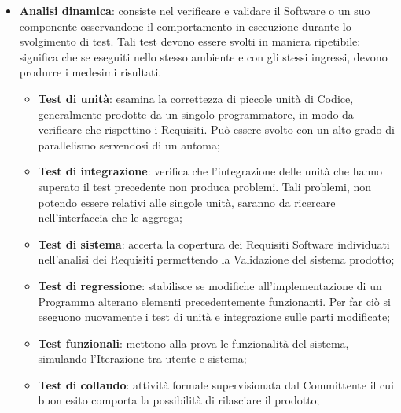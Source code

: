 {\begin{itemize}
\begin{itemize}
		\end{itemize}
		
		\item \textbf{Analisi dinamica}: consiste nel verificare e validare il Software o un suo componente osservandone il comportamento in esecuzione durante lo svolgimento di test. Tali test devono essere svolti in maniera ripetibile: significa che se eseguiti nello stesso ambiente e con gli stessi ingressi, devono produrre i medesimi risultati.
		\begin{itemize}
			\item \textbf{Test di unità}: esamina la correttezza di piccole unità di Codice, generalmente prodotte da un singolo programmatore, in modo da verificare che  rispettino i Requisiti. Può essere svolto con un alto grado di parallelismo servendosi di un automa;		
			\item \textbf{Test di integrazione}: verifica che l'integrazione delle unità che hanno superato il test precedente non produca problemi. Tali problemi, non potendo essere relativi alle singole unità, saranno da ricercare nell'interfaccia che le aggrega;	
			\item \textbf{Test di sistema}: accerta la copertura dei Requisiti\ped{g} Software individuati nell'analisi dei Requisiti permettendo la Validazione del sistema prodotto;
			\item \textbf{Test di regressione}: stabilisce se modifiche all'implementazione di un Programma alterano elementi precedentemente funzionanti. Per far ciò si eseguono nuovamente i test di unità e integrazione sulle parti modificate;			
			\item \textbf{Test funzionali}: mettono alla prova le funzionalità del sistema, simulando l'Iterazione tra utente e sistema;				
			\item \textbf{Test di collaudo}: attività formale supervisionata dal Committente il cui buon esito comporta la possibilità di rilasciare il prodotto;
		\end{itemize}
	\end{itemize}
	}
